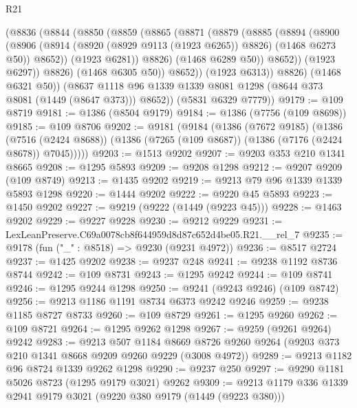 \begin{lexlean}{R21}
\begin{coremodule}
                (@8836
                  (@8844
                    (@8850
                      (@8859
                        (@8865
                          (@8871
                            (@8879
                              (@8885
                                (@8894
                                  (@8900
                                    (@8906
                                      (@8914
                                        (@8920 (@8929 @9113 (@1923 @6265)) @8826)
                                        (@1468 @6273 @50))
                                      @8652))
                                  (@1923 @6281))
                                @8826)
                              (@1468 @6289 @50))
                            @8652))
                        (@1923 @6297))
                      @8826)
                    (@1468 @6305 @50))
                  @8652))
              (@1923 @6313))
            @8826)
          (@1468 @6321 @50))
        (@8637 @1118 @96 @1339 @1339 @8081 @1298 (@8644 @373 @8081 (@1449 (@8647 @373))) @8652))
      (@5831 @6329 @7779))
@9179 := @109 @8719
@9181 := @1386 (@8504 @9179)
@9184 := @1386 (@7756 (@109 @8698))
@9185 := @109 @8706
@9202 := @9181
    (@9184
      (@1386
        (@7672 @9185)
        (@1386
          (@7516 (@2424 @8688))
          (@1386 (@7265 (@109 @8687)) (@1386 (@7176 (@2424 @8678)) @7045)))))
@9203 := @1513 @9202
@9207 := @9203 @353 @210 @1341 @8665
@9208 := @1295 @5893
@9209 := @9208 @1298
@9212 := @9207 @9209 (@109 @8749)
@9213 := @1435 @9202
@9219 := @9213 @79 @96 @1339 @1339 @5893 @1298
@9220 := @1444 @9202
@9222 := @9220 @45 @5893
@9223 := @1450 @9202
@9227 := @9219 (@9222 (@1449 (@9223 @45)))
@9228 := @1463 @9202
@9229 := @9227 @9228
@9230 := @9212 @9229
@9231 := LexLeanPreserve.C69a0078cb8f644959d8d87c652d4be05.R21.__rel_7
@9235 := @9178 (fun ("_" : @8518) => @9230 (@9231 @4972))
@9236 := @8517 @2724
@9237 := @1425 @9202
@9238 := @9237 @248
@9241 := @9238 @1192 @8736 @8744
@9242 := @109 @8731
@9243 := @1295 @9242
@9244 := @109 @8741
@9246 := @1295 @9244 @1298
@9250 := @9241 (@9243 @9246) (@109 @8742)
@9256 := @9213 @1186 @1191 @8734 @6373 @9242 @9246
@9259 := @9238 @1185 @8727 @8733
@9260 := @109 @8729
@9261 := @1295 @9260
@9262 := @109 @8721
@9264 := @1295 @9262 @1298
@9267 := @9259 (@9261 @9264) @9242
@9283 := @9213
    @507
    @1184
    @8669
    @8726
    @9260
    @9264
    (@9203 @373 @210 @1341 @8668 @9209 @9260 @9229 (@3008 @4972))
@9289 := @9213 @1182 @96 @8724 @1339 @9262 @1298
@9290 := @9237 @250
@9297 := @9290 @1181 @5026 @8723 (@1295 @9179 @3021) @9262
@9309 := @9213 @1179 @336 @1339 @2941 @9179 @3021 (@9220 @380 @9179 (@1449 (@9223 @380)))

\end{coremodule}
\end{lexlean}
